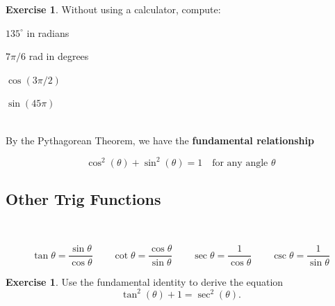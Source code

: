 \documentclass[11pt,reqno,final]{amsart}
\numberwithin{equation}{section}
\numberwithin{figure}{section}
\theoremstyle{definition} %
\newtheorem{exercise}[question]{Exercise}
\begin{document}
\begin{exercise}
        Without using a calculator, compute:\\[10pt]
        \begin{enumerate*}[(i)]
        \item $135^{\circ}$ in radians \qquad \qquad
        \item $7\pi/6$ rad in degrees \qquad \qquad 
        \item $\cos(3\pi/2)$ \qquad \qquad \qquad
        \item $\sin(45\pi)$ \qquad \qquad 
        \end{enumerate*}
\end{exercise}

$ $\\

By the Pythagorean Theorem, we have the \textbf{fundamental relationship}
        \begin{framed}
                \[
                        \cos^2(\theta) + \sin^2(\theta) = 1 \quad \mbox{for any angle $\theta$}
                \]
        \end{framed}

\subsection*{Other Trig Functions}

$ $

\begin{framed}
        \[
                \tan \theta = \dfrac{\sin \theta}{\cos \theta}
                \qquad
                \cot \theta = \dfrac{\cos \theta}{\sin \theta}
                \qquad
                \sec \theta = \dfrac{1}{\cos \theta}
                \qquad
                \csc \theta = \dfrac{1}{\sin \theta}
        \]
\end{framed}

\begin{exercise}
        Use the fundamental identity to derive the equation
        \[
                \tan^2(\theta) + 1 = \sec^{2}(\theta).
        \]
        \vfill
\end{exercise}

\newpage
\end{document}
